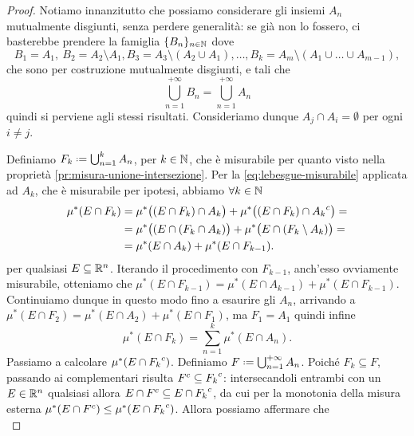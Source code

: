 \begin{proof}
	Notiamo innanzitutto che possiamo considerare gli insiemi $A_n$ mutualmente disgiunti, senza perdere generalità: se già non lo fossero, ci basterebbe prendere la famiglia $\{B_n\}_{n\in\mathbb{N}}$ dove
	\begin{equation}
		B_1=A_1,\ B_2=A_2\setminus A_1, B_3=A_3\setminus(A_2\cup A_1),\dots,B_k=A_m\setminus(A_1\cup\dots\cup A_{m-1}),
	\end{equation}
	che sono per costruzione mutualmente disgiunti, e tali che
	\begin{equation}
		\bigcup_{n=1}^{+\infty}B_n=\bigcup_{n=1}^{+\infty}A_n
	\end{equation}
	quindi si perviene agli stessi risultati.
	Consideriamo dunque $A_j\cap A_i=\emptyset$ per ogni $i\neq j$.

	Definiamo $F_k\defeq\bigcup_{n=1}^kA_n$, per $k\in\mathbb{N}$, che è misurabile per quanto visto nella proprietà \ref{pr:misura-unione-intersezione}.
	Per la \eqref{eq:lebesgue-misurabile} applicata ad $A_k$, che è misurabile per ipotesi, abbiamo $\forall k\in\mathbb{N}$
	\begin{equation}
		\begin{split}
			\mu^*(E\cap F_k)&=\mu^*\big( (E\cap F_k)\cap A_k\big)+\mu^*\big( (E\cap F_k)\cap{A_k}^c\big)=\\
			&=\mu^*\big((E\cap(F_k\cap A_k)\big)+\mu^*\big(E\cap (F_k\setminus A_k)\big)=\\
			&=\mu^*(E\cap A_k)+\mu^*(E\cap F_{k-1}).
		\end{split}
	\end{equation}
	per qualsiasi $E\subseteq\mathbb{R}^n$.
	Iterando il procedimento con $F_{k-1}$, anch'esso ovviamente misurabile, otteniamo che $\mu^*(E\cap F_{k-1})=\mu^*(E\cap A_{k-1})+\mu^*(E\cap F_{k-1})$.
	Continuiamo dunque in questo modo fino a esaurire gli $A_n$, arrivando a $\mu^*(E\cap F_2)=\mu^*(E\cap A_2)+\mu^*(E\cap F_1)$, ma $F_1=A_1$ quindi infine
	\begin{equation}
		\mu^*(E\cap F_k)=\sum_{n=1}^k\mu^*(E\cap A_n).
	\end{equation}
	Passiamo a calcolare $\mu^*(E\cap{F_k}^c)$.
	Definiamo $F\defeq\bigcup_{n=1}^{+\infty}A_n$.
	Poich\'e $F_k\subseteq F$, passando ai complementari risulta ${F}^c\subseteq{F_k}^c$: intersecandoli entrambi con un $E\in\mathbb{R}^n$ qualsiasi allora $E\cap{F}^c\subseteq E\cap{F_k}^c$,  da cui per la monotonia della misura esterna $\mu^*(E\cap{F}^c)\leq\mu^*(E\cap{F_k}^c)$.
	Allora possiamo affermare che
	\begin{equation}

\end{equation}
\end{proof}
